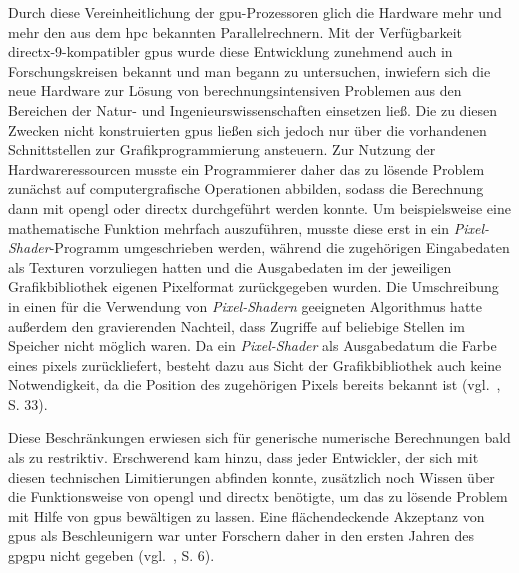 Durch diese Vereinheitlichung der \gls{gpu}-Prozessoren glich die Hardware mehr und mehr den aus dem \gls{hpc} bekannten
Parallelrechnern. Mit der Verfügbarkeit \gls{directx}-9-kompatibler \gls{gpu}s wurde diese Entwicklung zunehmend
auch in Forschungskreisen bekannt und man begann zu untersuchen, inwiefern sich die neue Hardware zur Lösung von
berechnungsintensiven Problemen aus den Bereichen der Natur- und Ingenieurswissenschaften einsetzen ließ. Die zu diesen
Zwecken nicht konstruierten \gls{gpu}s ließen sich jedoch nur über die vorhandenen Schnittstellen zur
Grafikprogrammierung ansteuern. Zur Nutzung der Hardwareressourcen musste ein Programmierer daher das zu lösende Problem
zunächst auf computergrafische Operationen abbilden, sodass die Berechnung dann mit \gls{opengl} oder \gls{directx}
durchgeführt werden konnte. Um beispielsweise eine mathematische Funktion mehrfach auszuführen, musste diese erst in
ein \textit{Pixel-Shader}-Programm umgeschrieben werden, während die zugehörigen Eingabedaten als Texturen
vorzuliegen hatten und die Ausgabedaten im der jeweiligen Grafikbibliothek eigenen Pixelformat zurückgegeben wurden.
Die Umschreibung in einen für die Verwendung von \textit{Pixel-Shadern} geeigneten Algorithmus hatte außerdem den
gravierenden Nachteil, dass Zugriffe auf beliebige Stellen im Speicher nicht möglich waren. Da ein \textit{Pixel-Shader}
als Ausgabedatum die Farbe eines \gls{pixel}s zurückliefert, besteht dazu aus Sicht der Grafikbibliothek auch keine
Notwendigkeit, da die Position des zugehörigen Pixels bereits bekannt ist (vgl.~\cite{kirkhwu}, S. 33).

Diese Beschränkungen erwiesen sich für generische numerische Berechnungen bald als zu restriktiv. Erschwerend kam hinzu, 
dass jeder Entwickler, der sich mit diesen technischen Limitierungen abfinden konnte, zusätzlich noch Wissen über die
Funktionsweise von \gls{opengl} und \gls{directx} benötigte, um das zu lösende Problem mit Hilfe von \gls{gpu}s
bewältigen zu lassen. Eine flächendeckende Akzeptanz von \gls{gpu}s als Beschleunigern war unter Forschern daher in den
ersten Jahren des \gls{gpgpu} nicht gegeben (vgl.~\cite{sandkand}, S. 6).

